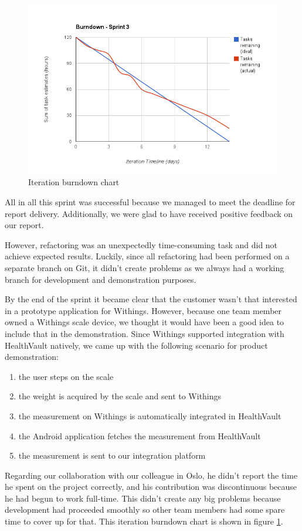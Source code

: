 \begin{figure}
\centering
\includegraphics[scale=0.60]{../Figures/burndownSprint3.png}
\caption{Iteration burndown chart}
\label{figure:burndownsprint3}
\end{figure}

All in all this sprint was successful because we managed to meet the deadline for report delivery.
Additionally, we were glad to have received positive feedback on our report.

However, refactoring was an unexpectedly time-consuming task and did not achieve expected results.
Luckily, since all refactoring had been performed on a separate branch on Git, it didn't create problems as we always had a working branch for development and demonstration purposes.

By the end of the sprint it became clear that the customer wasn't that interested in a prototype application for Withings. 
However, because one team member owned a Withings scale device, we thought it would have been a good idea to include that in the demonstration.
Since Withings supported integration with HealthVault natively, we came up with the following scenario for product demonstration:
\begin{enumerate}[1)]
\item the user steps on the scale
\item the weight is acquired by the scale and sent to Withings
\item the measurement on Withings is automatically integrated in HealthVault
\item the Android application fetches the measurement from HealthVault
\item the measurement is sent to our integration platform
\end{enumerate}
Regarding our collaboration with our colleague in Oslo, he didn't report the time he spent on the project correctly, and his contribution was discontinuous because he had begun to work full-time.
This didn't create any big problems because development had proceeded smoothly so other team members had some spare time to cover up for that.
This iteration burndown chart is shown in figure \ref{figure:burndownsprint3}.

